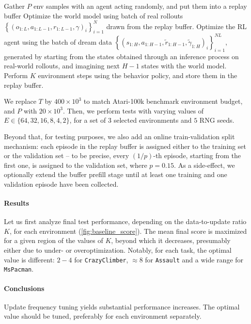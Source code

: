 \documentclass[en]{pracamgr}
\newcommand{\env}[1]{{\tt #1}}
\begin{document}
\begin{algorithm}
  \caption{Base DreamerV2 training loop}
  \label{alg:dreamerv2_loop}
  \begin{algorithmic}[1]
    \State Gather $P$ env samples with an agent acting randomly, and put them into a replay buffer
    \State Optimize the world model using batch of real rollouts $\left\{(o_{1:L}, a_{1:L-1}, r_{1:L-1}, \gamma)_i\right\}_{i=1}^N$ drawn from the replay buffer.
    \State Optimize the RL agent using the batch of dream data $\left\{(s_{1:H}, a_{1:H-1}, \widetilde{r}_{1:H-1}, \widetilde{\gamma}_{1:H})_i\right\}_{i=1}^{NL}$, generated by starting from the states obtained through an inference process on real-world rollouts, and imagining next $H-1$ states with the world model.
    \State Perform $K$ environment steps using the behavior policy, and store them in the replay buffer.
    \EndWhile
  \end{algorithmic}
\end{algorithm}

We replace $T$ by $400 \times 10^3$ to match Atari-100k benchmark environment budget, and $P$ with $20 \times 10^3$. Then, we perform tests with varying values of $E \in \{64, 32, 16, 8, 4, 2\}$, for a set of $3$ selected environments and $5$ RNG seeds.

Beyond that, for testing purposes, we also add an online train-validation split mechanism: each episode in the replay buffer is assigned either to the training set or the validation set -- to be precise, every $(1/p)$-th episode, starting from the first one, is assigned to the validation set, where $p = 0.15$. As a side-effect, we optionally extend the buffer prefill stage until at least one training and one validation episode have been collected.

\paragraph{Results} Let us first analyze final test performance, depending on the data-to-update ratio $K$, for each environment (\autoref{fig:baseline_score}). The mean final score is maximized for a given region of the values of $K$, beyond which it decreases, presumably either due to under- or overoptimization. Notably, for each task, the optimal value is different: $2-4$ for \env{CrazyClimber}, $\approx 8$ for \env{Assault} and a wide range for \env{MsPacman}.

\paragraph{Conclusions} Update frequency tuning yields substantial performance increases. The optimal value should be tuned, preferably for each environment separately.
\end{document}
